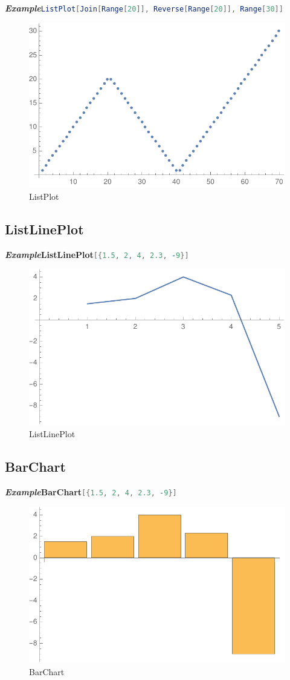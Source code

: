 \documentclass[10pt]{book}
\begin{document}
\noindent\emph{\textbf{Example}}\quad\lstinline[language=Mathematica]|ListPlot[Join[Range[20]], Reverse[Range[20]], Range[30]]|

\begin{figure}[H]
  \centering
  \includegraphics[width=0.45\linewidth]{figures/ListPlot2}
  \caption{ListPlot}
\end{figure}


\subsection{ListLinePlot}
\label{subsec:label}
\noindent\emph{\textbf{Example}}\quad\textbf{ListLinePlot}\lstinline[language=Mathematica]|[{1.5, 2, 4, 2.3, -9}]|
\begin{figure}[H]
  \centering
  \includegraphics[width=0.45\linewidth]{figures/ListLinePlot.pdf}
  \caption{ListLinePlot}
\end{figure}

\subsection{BarChart}
\label{subsec:label}

\noindent\emph{\textbf{Example}}\quad\textbf{BarChart}\lstinline[language=Mathematica]|[{1.5, 2, 4, 2.3, -9}]|



\begin{figure}[H]
  \centering
  \includegraphics[width=0.45\linewidth]{figures/BarChart}
  \caption{BarChart}
\end{figure}
\end{document}
